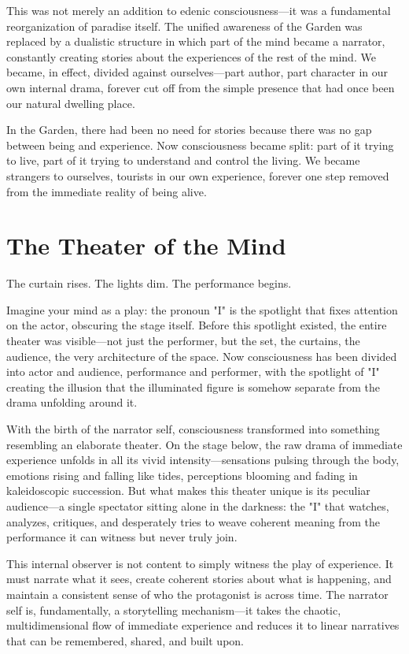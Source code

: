 This was not merely an addition to edenic consciousness—it was a fundamental reorganization of paradise itself. The unified awareness of the Garden was replaced by a dualistic structure in which part of the mind became a narrator, constantly creating stories about the experiences of the rest of the mind. We became, in effect, divided against ourselves—part author, part character in our own internal drama, forever cut off from the simple presence that had once been our natural dwelling place.

In the Garden, there had been no need for stories because there was no gap between being and experience. Now consciousness became split: part of it trying to live, part of it trying to understand and control the living. We became strangers to ourselves, tourists in our own experience, forever one step removed from the immediate reality of being alive.

\section{The Theater of the Mind}

The curtain rises. The lights dim. The performance begins.

Imagine your mind as a play: the pronoun "I" is the spotlight that fixes attention on the actor, obscuring the stage itself. Before this spotlight existed, the entire theater was visible—not just the performer, but the set, the curtains, the audience, the very architecture of the space. Now consciousness has been divided into actor and audience, performance and performer, with the spotlight of "I" creating the illusion that the illuminated figure is somehow separate from the drama unfolding around it.

With the birth of the narrator self, consciousness transformed into something resembling an elaborate theater. On the stage below, the raw drama of immediate experience unfolds in all its vivid intensity—sensations pulsing through the body, emotions rising and falling like tides, perceptions blooming and fading in kaleidoscopic succession. But what makes this theater unique is its peculiar audience—a single spectator sitting alone in the darkness: the "I" that watches, analyzes, critiques, and desperately tries to weave coherent meaning from the performance it can witness but never truly join.

This internal observer is not content to simply witness the play of experience. It must narrate what it sees, create coherent stories about what is happening, and maintain a consistent sense of who the protagonist is across time. The narrator self is, fundamentally, a storytelling mechanism—it takes the chaotic, multidimensional flow of immediate experience and reduces it to linear narratives that can be remembered, shared, and built upon.

